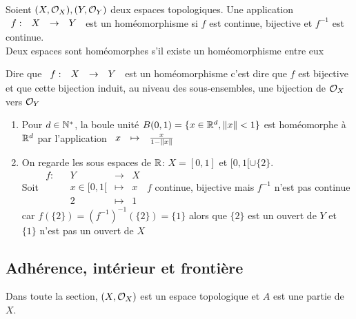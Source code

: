 \documentclass[]{report}
\begin{document}
    \begin{df}{}{}
        Soient $(X,\mathcal{O}_X),(Y,\mathcal{O}_Y)$ deux espaces topologiques. Une application $\begin{array}{ccccc} f : & X & \to & Y \end{array}$ est un homéomorphisme si $f$ est continue, bijective et $f^{-1}$ est continue.\\
        Deux espaces sont homéomorphes s'il existe un homéomorphisme entre eux
    \end{df}

    \begin{re}{}{}
        Dire que $\begin{array}{ccccc} f : & X & \to & Y \end{array}$ est un homéomorphisme c'est dire que $f$ est bijective et que cette bijection induit, au niveau des sous-ensembles, une bijection de $\mathcal{O}_X$ vers $\mathcal{O}_Y$
    \end{re}

    \begin{ex}{}{}
        \begin{enumerate}
            \item Pour $d\in\mathbb{N}^*$, la boule unité $B(0,1)=\{x\in\mathbb{R}^d,\lVert x \rVert<1\}$ est homéomorphe à $\mathbb{R}^d$ par l'application $\begin{array}{ccccc} x & \mapsto & \frac{x}{1-\lVert x \rVert} \end{array}$
            \item On regarde les sous espaces de $\mathbb{R}$: $X=[0,1]$ et $[0,1[\cup \{2\}$.\\
            Soit $\begin{array}{ccccc}
                f : & & Y & \to & X \\
                & & x\in[0,1[ & \mapsto & x \\
                & &  2  & \mapsto & 1
\end{array}$ $f$ continue, bijective mais $f^{-1}$ n'est pas continue car $f(\{2\})=(f^{-1})^{-1}(\{2\})=\{1\}$ alors que $\{2\}$ est un ouvert de $Y$ et $\{1\}$ n'est pas un ouvert de $X$
        \end{enumerate}
    \end{ex}

    \subsection{Adhérence, intérieur et frontière}

    Dans toute la section, $(X,\mathcal{O}_X)$ est un espace topologique et $A$ est une partie de $X$.
\end{document}
